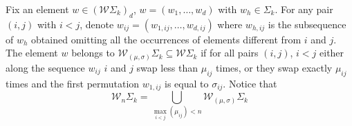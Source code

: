 \begin{definition}
	Fix an element  $w\in (\mathcal{W}\Sigma_k)_{d}$, $w=(w_{1},\dots , w_{d})$ with $w_{h}\in \Sigma_k$.
	For any pair $(i,j)$ with $i< j$, denote $w_{ij}=(w_{1,ij},\dots , w_{d,ij})$ where $w_{h,ij}$ is the subsequence of $w_{h}$ obtained omitting all the occurrences of elements different from $i$ and $j$.
	The element $w$ belongs to $\mathcal{W}_{(\mu,\sigma)}\Sigma_k\subseteq \mathcal{W}\Sigma_k$ if for all pairs $(i,j)$, $i< j$ either along the sequence $w_{ij}$ $i$ and $j$ swap less than $\mu_{ij}$ times,
	or they swap exactly $\mu_{ij}$ times and the first permutation $w_{1,ij}$ is equal to $\sigma_{ij}$.
	Notice that
	\begin{equation*}
		\label{def}
		\mathcal{W}_{n}\Sigma_k=\bigcup_{\max_{i<j} (\mu_{ij})< n} \mathcal{W}_{(\mu,\sigma)}\Sigma_{k}
	\end{equation*}
	\\
	\\
\end{definition}

